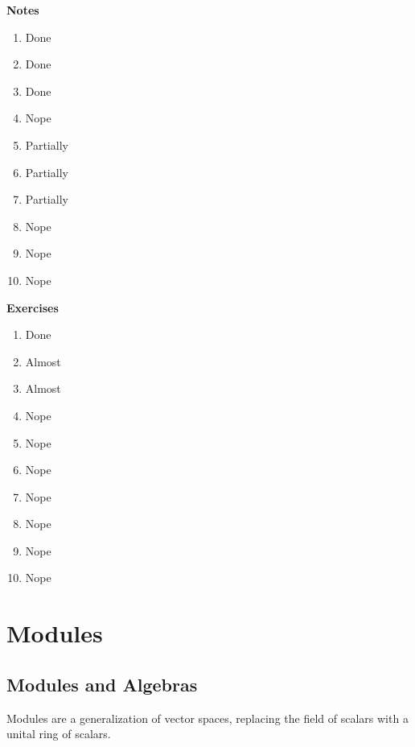 \documentclass[twoside,10pt]{report}
\begin{document}
\textbf{Notes}
\begin{enumerate}
	\item Done
	\item Done
	\item Done
	\item {\color{red}Nope}
	\item {\color{orange}Partially}
	\item {\color{orange}Partially}
	\item {\color{orange}Partially}
	\item {\color{red}Nope}
	\item {\color{red}Nope}
	\item {\color{red}Nope}
\end{enumerate}

\vspace{5mm}
\textbf{Exercises}
\begin{enumerate}
        \item Done
        \item {\color{yellow}Almost}
        \item {\color{yellow}Almost}
        \item {\color{red}Nope}
	\item {\color{red}Nope}
	\item {\color{red}Nope}
	\item {\color{red}Nope}
        \item {\color{red}Nope}
        \item {\color{red}Nope}
        \item {\color{red}Nope}
\end{enumerate}

\tableofcontents


\chapter{Modules}

\section{Modules and Algebras}

Modules are a generalization of vector spaces, replacing the field of scalars with a unital ring of scalars.
\end{document}
